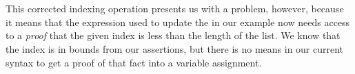 \documentclass[sigplan,review]{acmart}\settopmatter{printfolios=true,printccs=false,printacmref=false}
\begin{document}
\begin{code}
\>[2]\AgdaOperator{\AgdaFunction{\AgdaUnderscore{}!\AgdaUnderscore{}}}\AgdaSpace{}%
\AgdaSymbol{:}\AgdaSpace{}%
\AgdaSpace{}%
\AgdaSymbol{\{}\AgdaSymbol{\}}\AgdaSpace{}%
\AgdaSpace{}%
\AgdaSymbol{(}\AgdaSpace{}%
\AgdaSymbol{:}\AgdaSpace{}%
\AgdaSpace{}%
\AgdaSymbol{)}\AgdaSpace{}%
\AgdaSpace{}%
\AgdaSpace{}%
\AgdaOperator{\AgdaFunction{<}}\AgdaSpace{}%
\AgdaSpace{}%
\AgdaSpace{}%
\AgdaSpace{}%
\<%
\\
%
\>[2]\AgdaOperator{\AgdaFunction{\AgdaUnderscore{}!\AgdaUnderscore{}}}\AgdaSpace{}%
\AgdaSymbol{\{}\AgdaSpace{}%
\AgdaSymbol{=}\AgdaSpace{}%
\AgdaSpace{}%
\AgdaSymbol{\AgdaUnderscore{}\}}\AgdaSpace{}%
\AgdaSymbol{(}\AgdaSpace{}%
\AgdaSpace{}%
\AgdaSymbol{)}\AgdaSpace{}%
\AgdaSymbol{(}\AgdaSpace{}%
\AgdaSymbol{)}\AgdaSpace{}%
\AgdaSymbol{=}\AgdaSpace{}%
\AgdaSpace{}%
\AgdaOperator{\AgdaFunction{!}}\AgdaSpace{}%
\<%
\\
%
\>[2]\AgdaOperator{\AgdaFunction{\AgdaUnderscore{}!\AgdaUnderscore{}}}\AgdaSpace{}%
\AgdaSymbol{\{}\AgdaSpace{}%
\AgdaSymbol{=}\AgdaSpace{}%
\AgdaSpace{}%
\AgdaSymbol{\}}\AgdaSpace{}%
\AgdaSymbol{(}\AgdaSpace{}%
\AgdaSpace{}%
\AgdaSymbol{)}\AgdaSpace{}%
\AgdaSymbol{(}\AgdaSpace{}%
\AgdaSymbol{)}\AgdaSpace{}%
\AgdaSymbol{=}\AgdaSpace{}%
\<%
\end{code}
This corrected indexing operation presents us with a problem, however, 
because it means that the expression used to update the 
in our example now needs access to a \emph{proof} that the given 
index is less than the length of the list. We know that the index is in 
bounds from our assertions, but there is no means in our current syntax 
to get a proof of that fact into a variable assignment.
\end{document}
